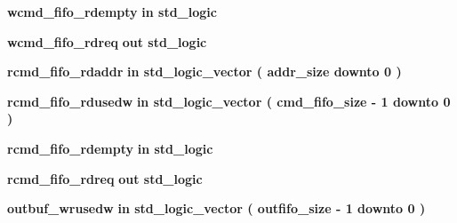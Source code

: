 \begin{DoxyCompactItemize}
\item 
{\bf wcmd\+\_\+fifo\+\_\+rdempty}  {\bfseries {\bfseries \textcolor{keywordflow}{in}\textcolor{vhdlchar}{ }}} {\bfseries \textcolor{comment}{std\+\_\+logic}\textcolor{vhdlchar}{ }} 
\item 
{\bf wcmd\+\_\+fifo\+\_\+rdreq}  {\bfseries {\bfseries \textcolor{keywordflow}{out}\textcolor{vhdlchar}{ }}} {\bfseries \textcolor{comment}{std\+\_\+logic}\textcolor{vhdlchar}{ }} 
\item 
{\bf rcmd\+\_\+fifo\+\_\+rdaddr}  {\bfseries {\bfseries \textcolor{keywordflow}{in}\textcolor{vhdlchar}{ }}} {\bfseries \textcolor{comment}{std\+\_\+logic\+\_\+vector}\textcolor{vhdlchar}{ }\textcolor{vhdlchar}{(}\textcolor{vhdlchar}{ }\textcolor{vhdlchar}{ }\textcolor{vhdlchar}{ }\textcolor{vhdlchar}{ }{\bfseries {\bf addr\+\_\+size}} \textcolor{vhdlchar}{ }\textcolor{keywordflow}{downto}\textcolor{vhdlchar}{ }\textcolor{vhdlchar}{ } \textcolor{vhdldigit}{0} \textcolor{vhdlchar}{ }\textcolor{vhdlchar}{)}\textcolor{vhdlchar}{ }} 
\item 
{\bf rcmd\+\_\+fifo\+\_\+rdusedw}  {\bfseries {\bfseries \textcolor{keywordflow}{in}\textcolor{vhdlchar}{ }}} {\bfseries \textcolor{comment}{std\+\_\+logic\+\_\+vector}\textcolor{vhdlchar}{ }\textcolor{vhdlchar}{(}\textcolor{vhdlchar}{ }\textcolor{vhdlchar}{ }\textcolor{vhdlchar}{ }\textcolor{vhdlchar}{ }{\bfseries {\bf cmd\+\_\+fifo\+\_\+size}} \textcolor{vhdlchar}{-\/}\textcolor{vhdlchar}{ } \textcolor{vhdldigit}{1} \textcolor{vhdlchar}{ }\textcolor{keywordflow}{downto}\textcolor{vhdlchar}{ }\textcolor{vhdlchar}{ } \textcolor{vhdldigit}{0} \textcolor{vhdlchar}{ }\textcolor{vhdlchar}{)}\textcolor{vhdlchar}{ }} 
\item 
{\bf rcmd\+\_\+fifo\+\_\+rdempty}  {\bfseries {\bfseries \textcolor{keywordflow}{in}\textcolor{vhdlchar}{ }}} {\bfseries \textcolor{comment}{std\+\_\+logic}\textcolor{vhdlchar}{ }} 
\item 
{\bf rcmd\+\_\+fifo\+\_\+rdreq}  {\bfseries {\bfseries \textcolor{keywordflow}{out}\textcolor{vhdlchar}{ }}} {\bfseries \textcolor{comment}{std\+\_\+logic}\textcolor{vhdlchar}{ }} 
\item 
{\bf outbuf\+\_\+wrusedw}  {\bfseries {\bfseries \textcolor{keywordflow}{in}\textcolor{vhdlchar}{ }}} {\bfseries \textcolor{comment}{std\+\_\+logic\+\_\+vector}\textcolor{vhdlchar}{ }\textcolor{vhdlchar}{(}\textcolor{vhdlchar}{ }\textcolor{vhdlchar}{ }\textcolor{vhdlchar}{ }\textcolor{vhdlchar}{ }{\bfseries {\bf outfifo\+\_\+size}} \textcolor{vhdlchar}{-\/}\textcolor{vhdlchar}{ } \textcolor{vhdldigit}{1} \textcolor{vhdlchar}{ }\textcolor{keywordflow}{downto}\textcolor{vhdlchar}{ }\textcolor{vhdlchar}{ } \textcolor{vhdldigit}{0} \textcolor{vhdlchar}{ }\textcolor{vhdlchar}{)}\textcolor{vhdlchar}{ }} 

\end{DoxyCompactItemize}
